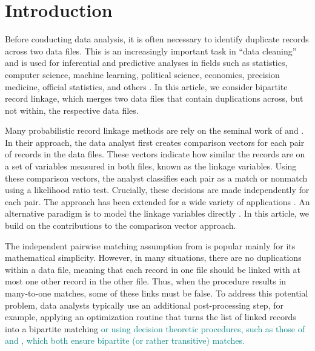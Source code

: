 \documentclass[ba]{imsart}
\begin{document}
\begin{frontmatter}
\begin{keyword}
\end{keyword}


\end{frontmatter}






\section{Introduction}
\label{sec:introduction}

Before conducting data analysis, it is often necessary to identify duplicate records across two data files. This is an increasingly important task in ``data cleaning'' and is used for inferential and predictive analyses in fields such as statistics, computer science, machine learning, political science, economics, precision medicine, official statistics, and others \citep{christen_2012, gutman2013bayesian, DalzellReiter18, tang2020}. In this article, we consider bipartite record linkage, which merges two data files that contain duplications across, but not within, the respective data files. 

Many probabilistic record linkage methods are rely on the seminal work of \cite{fellegi_theory_1969} and \cite{newcombe_automatic_1959}. In their approach, the data analyst first creates comparison vectors for each pair of records in the data files. These vectors indicate how similar the records are on a set of variables measured in both files, known as the linkage variables.  Using these comparison vectors, the analyst classifies each pair as a match or nonmatch using a likelihood ratio test. Crucially, these decisions are made independently for each pair. The \cite{fellegi_theory_1969} approach has been extended for a wide variety of applications \citep[e.g.,][]{Winkler1990, fair2004generalized, wagner2014person, gill2003english, enamorado2019using, aleshinguendel2021multifile}. An alternative paradigm is to model the linkage variables directly \citep[e.g.,][]{tancredi2011hierarchical, steorts_bayesian_2016, marchant_distributed_2019, betancourt2022prior}. In this article, we build on the contributions to the comparison vector approach. 



The independent pairwise matching assumption from \cite{fellegi_theory_1969} is popular mainly for its mathematical simplicity. However, in many situations, there are no duplications within a data file, meaning that each record in one file should be linked with at most one other record in the other file. Thus, when the procedure results in many-to-one matches, some of these links must be false. To address this potential problem, data analysts typically use an additional post-processing step, for example, applying an optimization routine that turns the list of linked records into a bipartite matching \citep{jaro1989} \textcolor{teal}{or using decision theoretic procedures, such as those of \cite{sadinle_bayesian_2017} and \cite{steorts_bayesian_2016}, which both ensure  bipartite (or rather transitive) matches.}
\end{document}
